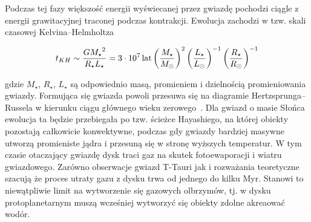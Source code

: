 
Podczas tej fazy większość energii wyświecanej przez gwiazdę pochodzi ciągle z
energii grawitacyjnej traconej podczas kontrakcji. Ewolucja zachodzi w tzw.
skali czasowej Kelvina--Helmholtza 

\begin{equation} 
   t_{KH} \sim  \frac{G{M_{\star}}^2}{R_{\star}L_{\star}} = 3\cdot 10^7 \hbox{$\thinspace\textrm{lat}$}
   \left(\frac{M_\star}{M_\odot}\right)^{2}
   \left(\frac{L_\star}{L_\odot}\right)^{-1}
   \left(\frac{R_\star}{R_\odot}\right)^{-1}
\end{equation}

gdzie $M_{\star}$, $R_{\star}$, $L_{\star}$ są odpowiednio masą, promieniem i
dzielnością promieniowania gwiazdy. Formująca się gwiazda powoli przesuwa się na
diagramie Hertzsprunga--Russela w kierunku ciągu głównego wieku
zerowego~\cite{palla}.  Dla gwiazd o masie Słońca ewolucja ta będzie przebiegała
po tzw. ścieżce Hayashiego, na której obiekty pozostają całkowicie konwektywne,
podczas gdy gwiazdy bardziej masywne utworzą promieniste jądra i przesuną się
w stronę wyższych temperatur. W tym czasie otaczający gwiazdę dysk traci
gaz na skutek fotoewaporacji i wiatru gwiazdowego. Zarówno obserwacje gwiazd
T-Tauri jak i rozważania teoretyczne~\cite{AP12} szacują że proces utraty gazu
z dysku trwa od jednego do kilku Myr.  Stanowi to niewątpliwie limit na
wytworzenie się gazowych olbrzymów, tj. w dysku protoplanetarnym muszą
wcześniej wytworzyć się obiekty zdolne akreaować wodór.

